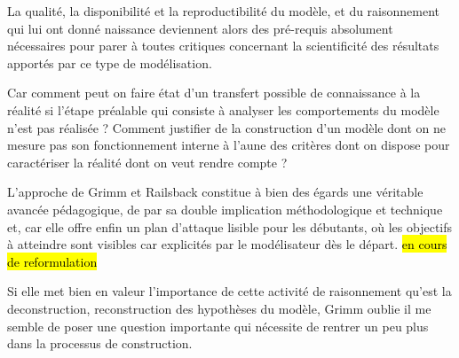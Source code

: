 La qualité, la disponibilité et la reproductibilité du modèle, et du raisonnement qui lui ont donné naissance deviennent alors des pré-requis absolument nécessaires pour parer à toutes critiques concernant la scientificité des résultats apportés par ce type de modélisation. %

Car comment peut on faire état d'un transfert possible de connaissance à la réalité si l'étape préalable qui consiste à analyser les comportements du modèle n'est pas réalisée ? Comment justifier de la construction d'un modèle dont on ne mesure pas son fonctionnement interne à l'aune des critères dont on dispose pour caractériser la réalité dont on veut rendre compte ?

L'approche de Grimm et Railsback constitue à bien des égards une véritable avancée pédagogique, de par sa double implication méthodologique et technique et, car elle offre enfin un plan d'attaque lisible pour les débutants, où les objectifs à atteindre sont visibles car explicités par le modélisateur dès le départ. \hl{en cours de reformulation}

Si elle met bien en valeur l'importance de cette activité de raisonnement qu'est la deconstruction, reconstruction des hypothèses du modèle, Grimm oublie il me semble de poser une question importante qui nécessite de rentrer un peu plus dans la processus de construction. %

